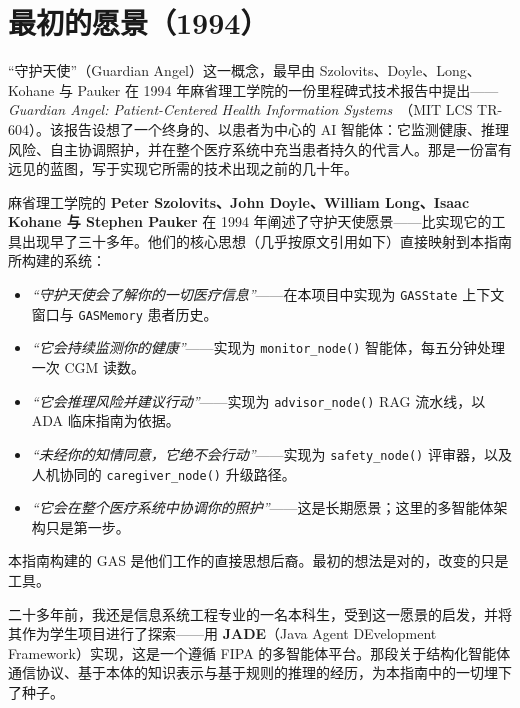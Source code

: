 \documentclass[11pt,a4paper,openany]{book}
\begin{document}
\section*{最初的愿景（1994）}
\label{gas-history}

“守护天使”（Guardian Angel）这一概念，最早由 Szolovits、Doyle、Long、Kohane 与 Pauker 在 1994 年麻省理工学院的一份里程碑式技术报告中提出——\emph{Guardian Angel: Patient-Centered Health Information Systems}~\cite{szolovits1994guardian}（MIT LCS TR-604）。该报告设想了一个终身的、以患者为中心的 AI 智能体：它监测健康、推理风险、自主协调照护，并在整个医疗系统中充当患者持久的代言人。那是一份富有远见的蓝图，写于实现它所需的技术出现之前的几十年。

\begin{keybox}
麻省理工学院的 \textbf{Peter Szolovits、John Doyle、William Long、Isaac Kohane 与 Stephen Pauker} 在 1994 年阐述了守护天使愿景——比实现它的工具出现早了三十多年。他们的核心思想（几乎按原文引用如下）直接映射到本指南所构建的系统：

\begin{itemize}
  \item \emph{“守护天使会了解你的一切医疗信息”}——在本项目中实现为 \texttt{GASState} 上下文窗口与 \texttt{GASMemory} 患者历史。
  \item \emph{“它会持续监测你的健康”}——实现为 \texttt{monitor\_node()} 智能体，每五分钟处理一次 CGM 读数。
  \item \emph{“它会推理风险并建议行动”}——实现为 \texttt{advisor\_node()} RAG 流水线，以 ADA 临床指南为依据。
  \item \emph{“未经你的知情同意，它绝不会行动”}——实现为 \texttt{safety\_node()} 评审器，以及人机协同的 \texttt{caregiver\_node()} 升级路径。
  \item \emph{“它会在整个医疗系统中协调你的照护”}——这是长期愿景；这里的多智能体架构只是第一步。
\end{itemize}

本指南构建的 GAS 是他们工作的直接思想后裔。最初的想法是对的，改变的只是工具。
\end{keybox}

二十多年前，我还是信息系统工程专业的一名本科生，受到这一愿景的启发，并将其作为学生项目进行了探索——用 \textbf{JADE}（Java Agent DEvelopment Framework）实现，这是一个遵循 FIPA 的多智能体平台。那段关于结构化智能体通信协议、基于本体的知识表示与基于规则的推理的经历，为本指南中的一切埋下了种子。
\end{document}
